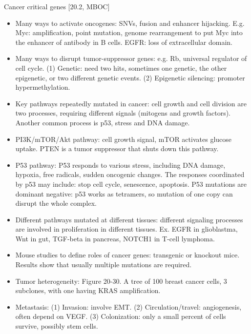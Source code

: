 \documentclass{report}
\begin{document}
Cancer critical genes [20.2, MBOC]
\begin{itemize}
	
	\item Many ways to activate oncogenes: SNVs, fusion and enhancer hijacking. E.g. Myc: amplification, point mutation, genome rearrangement to put Myc into the enhancer of antibody in B cells. EGFR: loss of extracellular domain. 
	
	\item Many ways to disrupt tumor-suppressor genes: e.g. Rb, universal regulator of cell cycle. (1) Genetic: need two hits, sometimes one genetic, the other epigenetic, or two different genetic events. (2) Epigenetic silencing: promoter hypermethylation.  
	
	\item Key pathways repeatedly mutated in cancer: cell growth and cell division are two processes, requiring different signals (mitogens and growth factors). Another common process is p53, stress and DNA damage.  
	
	\item PI3K/mTOR/Akt pathway: cell growth signal, mTOR activates glucose uptake. PTEN is a tumor suppressor that shuts down this pathway. 
	
	\item P53 pathway: P53 responds to various stress, including DNA damage, hypoxia, free radicals, sudden oncogenic changes. The responses coordinated by p53 may include: stop cell cycle, senescence, apoptosis. P53 mutations are dominant negative: p53 works as tetramers, so mutation of one copy can disrupt the whole complex. 
	
	\item Different pathways mutated at different tissues: different signaling processes are involved in proliferation in different tissues. Ex. EGFR in glioblastma, Wnt in gut, TGF-beta in pancreas, NOTCH1 in T-cell lymphoma. 
	
	\item Mouse studies to define roles of cancer genes: transgenic or knockout mice. Results show that usually multiple mutations are required. 
	
	\item Tumor heterogeneity: Figure 20-30. A tree of 100 breast cancer cells, 3 subclones, with one having KRAS amplification. 
	
	\item Metastasis: (1) Invasion: involve EMT. (2) Circulation/travel: angiogenesis, often depend on VEGF.  (3) Colonization: only a small percent of cells survive, possibly stem cells. 
	

\end{itemize}
\end{document}
